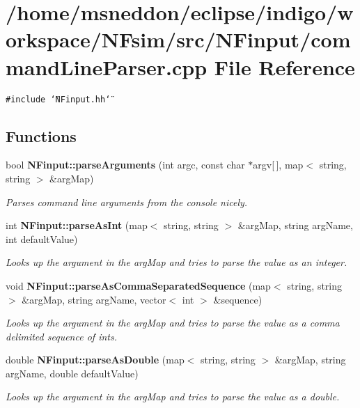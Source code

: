 \section{/home/msneddon/eclipse/indigo/workspace/NFsim/src/NFinput/commandLineParser.cpp File Reference}
\label{commandLineParser_8cpp}


{\tt \#include \char`\"{}NFinput.hh\char`\"{}}\par
\subsection*{Functions}
\begin{CompactItemize}
\item 
bool {\bf NFinput::parseArguments} (int argc, const char $\ast$argv[$\,$], map$<$ string, string $>$ \&argMap)
\begin{CompactList}\small\item\em Parses command line arguments from the console nicely. \item\end{CompactList}\item 
int {\bf NFinput::parseAsInt} (map$<$ string, string $>$ \&argMap, string argName, int defaultValue)
\begin{CompactList}\small\item\em Looks up the argument in the argMap and tries to parse the value as an integer. \item\end{CompactList}\item 
void {\bf NFinput::parseAsCommaSeparatedSequence} (map$<$ string, string $>$ \&argMap, string argName, vector$<$ int $>$ \&sequence)
\begin{CompactList}\small\item\em Looks up the argument in the argMap and tries to parse the value as a comma delimited sequence of ints. \item\end{CompactList}\item 
double {\bf NFinput::parseAsDouble} (map$<$ string, string $>$ \&argMap, string argName, double defaultValue)
\begin{CompactList}\small\item\em Looks up the argument in the argMap and tries to parse the value as a double. \item\end{CompactList}\item 

\end{CompactItemize}
